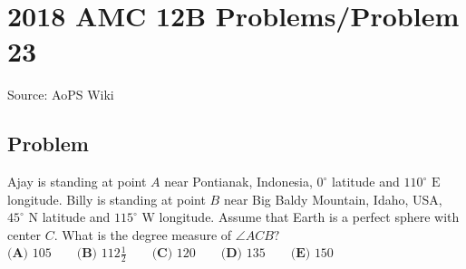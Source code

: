 \documentclass[12pt]{article}
\begin{document}
\section*{{2018 AMC 12B Problems/Problem 23}}
Source: AoPS Wiki

\subsection*{Problem}
Ajay is standing at point $A$ near Pontianak, Indonesia, $0^\circ$ latitude and $110^\circ \text{ E}$ longitude. Billy is standing at point $B$ near Big Baldy Mountain, Idaho, USA, $45^\circ \text{ N}$ latitude and $115^\circ \text{ W}$ longitude. Assume that Earth is a perfect sphere with center $C.$ What is the degree measure of $\angle ACB?$ $\textbf{(A) }105 \qquad \textbf{(B) }112\frac{1}{2} \qquad \textbf{(C) }120 \qquad \textbf{(D) }135 \qquad \textbf{(E) }150 \qquad$
\end{document}
